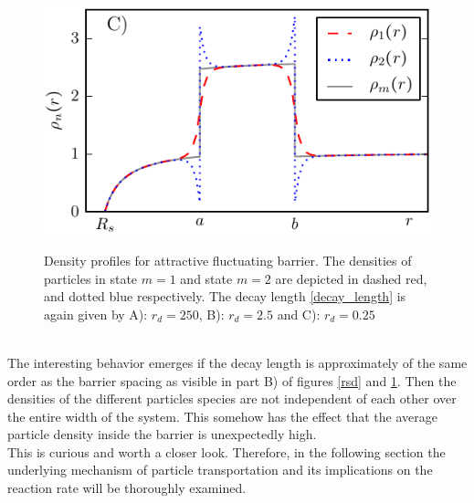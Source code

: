 \begin{minipage}[t]{0.5 \textwidth}
    \begin{figure}[H]
        \includegraphics[width = 1 \textwidth]{plots/d6.pdf}
    \end{figure}
\end{minipage}\hspace{0.07\textwidth}\begin{minipage}[t]{0.43 \textwidth}
    \begin{figure}[H]
        \caption{Density profiles for attractive fluctuating barrier. The densities of particles in state $m=1$ and state $m=2$ are depicted in dashed red, and dotted blue respectively. The decay length \eqref{decay_length} is again given by A): $r_d = 250$, B): $r_d=2.5$ and C): $r_d=0.25$ \label{asd}}
    \end{figure}
\end{minipage} 
\vspace{0.5 cm} \\
The interesting behavior emerges if the decay length is approximately of the same order as the barrier spacing as visible in part B) of figures \ref{rsd} and \ref{asd}. Then the densities of the different particles species are not independent of each other over the entire width of the system. This somehow has the effect that the average particle density inside the barrier is unexpectedly high. \\
This is curious and worth a closer look. Therefore, in the following section the underlying mechanism of particle transportation and its implications on the reaction rate will be thoroughly examined. \\ 

